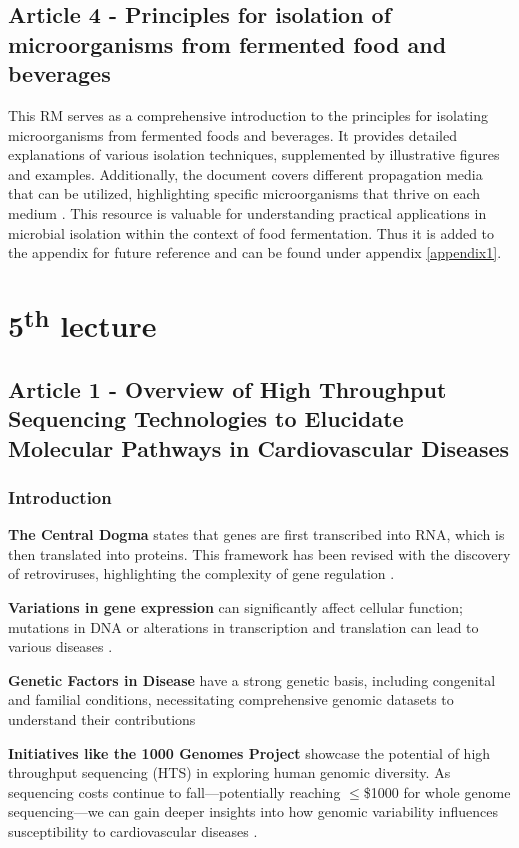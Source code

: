 \subsection{Article 4 - Principles for isolation of microorganisms from fermented food and beverages}
This RM serves as a comprehensive introduction to the principles for isolating microorganisms from fermented foods and beverages. It provides detailed explanations of various isolation techniques, supplemented by illustrative figures and examples. Additionally, the document covers different propagation media that can be utilized, highlighting specific microorganisms that thrive on each medium \cite*{L4-Isolation101}. This resource is valuable for understanding practical applications in microbial isolation within the context of food fermentation. Thus it is added to the appendix for future reference and can be found under appendix \ref*{appendix1}.

\section{5\texorpdfstring{\textsuperscript{th}}{th} lecture}
\subsection{Article 1 - Overview of High Throughput Sequencing Technologies to Elucidate Molecular Pathways in Cardiovascular Diseases}
\subsubsection*{Introduction}
\textbf{The Central Dogma} states that genes are first transcribed into RNA, which is then translated into proteins. This framework has been revised with the discovery of retroviruses, highlighting the complexity of gene regulation \cite*{L5-HighThroughput}.

\textbf{Variations in gene expression} can significantly affect cellular function; mutations in DNA or alterations in transcription and translation can lead to various diseases \cite*{L5-HighThroughput}.

\textbf{Genetic Factors in Disease} have a strong genetic basis, including congenital and familial conditions, necessitating comprehensive genomic datasets to understand their contributions \cite*{L5-HighThroughput} 

\textbf{Initiatives like the 1000 Genomes Project} showcase the potential of high throughput sequencing (HTS) in exploring human genomic diversity. As sequencing costs continue to fall—potentially reaching $\leq$\$1000 for whole genome sequencing—we can gain deeper insights into how genomic variability influences susceptibility to cardiovascular diseases \cite*{L5-HighThroughput}.

